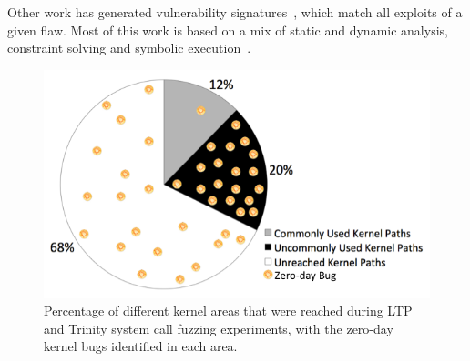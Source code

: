 Other work has generated vulnerability
signatures~\cite{brumley2006towards}, which match all exploits
of a given flaw. Most of this work is based on a mix of static and
dynamic analysis, constraint solving and symbolic execution~\cite{chou2003static}.


\begin{figure}%
\centering
\includegraphics[width=1.0\columnwidth]{diagram/kernel_coverage.png}
\caption{\small Percentage of different kernel areas that were reached during
 LTP and Trinity system call fuzzing experiments, with the zero-day kernel bugs identified
 in each area.}
\label{fig:coverage}
\end{figure}
